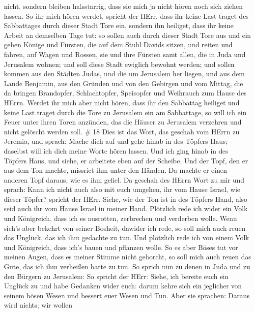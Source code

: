 nicht, sondern bleiben halsstarrig, dass sie mich ja nicht hören noch
sich ziehen lassen.  So ihr mich hören werdet, spricht der
HErr, dass ihr keine Last traget des Sabbattages durch dieser Stadt Tore
ein, sondern ihn heiliget, dass ihr keine Arbeit an demselben Tage tut:
 so sollen auch durch dieser Stadt Tore aus und ein gehen
Könige und Fürsten, die auf dem Stuhl Davids sitzen, und reiten und
fahren, auf Wagen und Rossen, sie und ihre Fürsten samt allen, die in
Juda und Jerusalem wohnen; und soll diese Stadt ewiglich bewohnt werden;
 und sollen kommen aus den Städten Judas, und die um
Jerusalem her liegen, und aus dem Lande Benjamin, aus den Gründen und
von den Gebirgen und vom Mittag, die da bringen Brandopfer,
Schlachtopfer, Speisopfer und Weihrauch zum Hause des HErrn.
 Werdet ihr mich aber nicht hören, dass ihr den Sabbattag
heiliget und keine Last traget durch die Tore zu Jerusalem ein am
Sabbattage, so will ich ein Feuer unter ihren Toren anzünden, das die
Häuser zu Jerusalem verzehren und nicht gelöscht werden soll. \# 18
 Dies ist das Wort, das geschah vom HErrn zu Jeremia, und
sprach:  Mache dich auf und gehe hinab in des Töpfers Haus;
daselbst will ich dich meine Worte hören lassen.  Und ich
ging hinab in des Töpfers Haus, und siehe, er arbeitete eben auf der
Scheibe.  Und der Topf, den er aus dem Ton machte, missriet
ihm unter den Händen. Da machte er einen anderen Topf daraus, wie es ihm
gefiel.  Da geschah des HErrn Wort zu mir und sprach:
 Kann ich nicht auch also mit euch umgehen, ihr vom Hause
Israel, wie dieser Töpfer? spricht der HErr. Siehe, wie der Ton ist in
des Töpfers Hand, also seid auch ihr vom Hause Israel in meiner Hand.
 Plötzlich rede ich wider ein Volk und Königreich, dass ich
es ausrotten, zerbrechen und verderben wolle.  Wenn sich's
aber bekehrt von seiner Bosheit, dawider ich rede, so soll mich auch
reuen das Unglück, das ich ihm gedachte zu tun.  Und
plötzlich rede ich von einem Volk und Königreich, dass ich's bauen und
pflanzen wolle.  So es aber Böses tut vor meinen Augen,
dass es meiner Stimme nicht gehorcht, so soll mich auch reuen das Gute,
das ich ihm verheißen hatte zu tun.  So sprich nun zu denen
in Juda und zu den Bürgern zu Jerusalem: So spricht der HErr: Siehe, ich
bereite euch ein Unglück zu und habe Gedanken wider euch: darum kehre
sich ein jeglicher von seinem bösen Wesen und bessert euer Wesen und
Tun.  Aber sie sprachen: Daraus wird nichts; wir wollen
